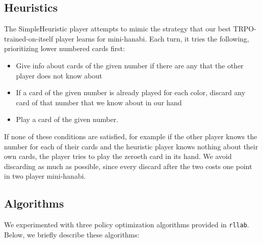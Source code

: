 \subsection{Heuristics}

The SimpleHeuristic player attempts to mimic the strategy that our best
TRPO-trained-on-itself player learns for mini-hanabi. Each turn, it tries the
following, prioritizing lower numbered cards first:

\begin{itemize}
\item Give info about cards of the given number if there are any that the other player does not know about
\item If a card of the given number is already played for each color, discard any card of that number that we know about in our hand
\item Play a card of the given number.
\end{itemize}

If none of these conditions are satisfied, for example if the other player
knows the number for each of their cards and the heuristic player knows
nothing about their own cards, the player tries to play the zeroeth card in
its hand. We avoid discarding as much as possible, since every discard after
the two costs one point in two player mini-hanabi.




\subsection{Algorithms}
We experimented with three policy optimization algorithms provided in
\texttt{rllab}. Below, we briefly describe these algorithms:

